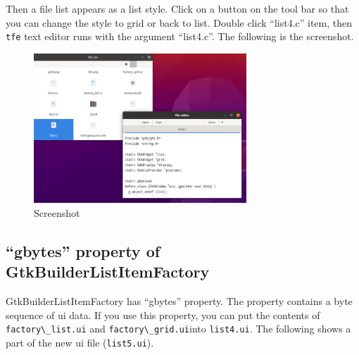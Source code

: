 Then a file list appears as a list style. Click on a button on the tool
bar so that you can change the style to grid or back to list. Double
click ``list4.c'' item, then \passthrough{\lstinline!tfe!} text editor
runs with the argument ``list4.c''. The following is the screenshot.

\begin{figure}
\centering
\includegraphics[width=8cm,height=5.62cm]{../image/screenshot_list4.png}
\caption{Screenshot}
\end{figure}

\hypertarget{gbytes-property-of-gtkbuilderlistitemfactory}{%
\subsection{``gbytes'' property of
GtkBuilderListItemFactory}\label{gbytes-property-of-gtkbuilderlistitemfactory}}

GtkBuilderListItemFactory has ``gbytes'' property. The property contains
a byte sequence of ui data. If you use this property, you can put the
contents of \passthrough{\lstinline!factory\_list.ui!} and
\passthrough{\lstinline!factory\_grid.ui!}into
\passthrough{\lstinline!list4.ui!}. The following shows a part of the
new ui file (\passthrough{\lstinline!list5.ui!}).

